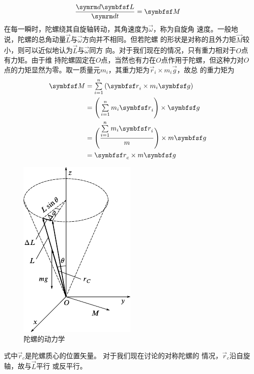 ~\vspace{-1.56em}
\begin{equation}\label{eqn:10.05.01}
    \frac {  \dif \vec{L} } {  \dif t } = \vec{M}
\end{equation}
在每一瞬时，陀螺绕其自旋轴转动，其角速度为$ \vec{\omega} $，称为自旋角
速度。一般地说，陀螺的总角动量$\vec{L}$与$\vec{\omega}$方向并不相同。但若陀螺
的形状是对称的且外力矩$\vec{M}$较小，则可以近似地认为$\vec{L}$与$\vec{\omega}$同方
向。对于我们现在的情况，只有重力相对于$ O $点有力矩。由于维
持陀螺固定在$ O $点，当然也有力在$ O $点作用于陀螺，但这种力对$ O $
点的力矩显然为零。取一质量元$ m _ i $，其重力矩为$  \vec{r} _ { i } \times m _ { i } \vec{g}   $，故总
的重力矩为
\begin{equation*}
    \begin{split}
        \vec{M} &= \sumx_{ i = 1 } ^ n \left( \vec{r} _ i \times m _ { i } \vec{g} \right) \\
                &= \Bigg( \sumx_{ i = 1 } ^ n m _ i \vec{r} _ { i } \Bigg) \times \vec{g} \\
                &= \Bigg( \frac { \sumx _{ i = 1 } ^ n m _ i \vec{r} _ i } { m } \Bigg) \times m \vec{g} \\
                &= \vec{r} _ { c } \times m \vec{g}
    \end{split}
\end{equation*}
\begin{figure}
    \vspace{-3em}
    \centering
    \includegraphics{figure/fig10.22}
    \caption{陀螺的动力学}
    \label{fig:10.22}
\end{figure}
式中$ \vec{r} _ c $是陀螺质心的位置矢量。
对于我们现在讨论的对称陀螺的
情况，$ \vec{r} _ c $沿自旋轴，故与$ \vec{L} $平行
或反平行。

